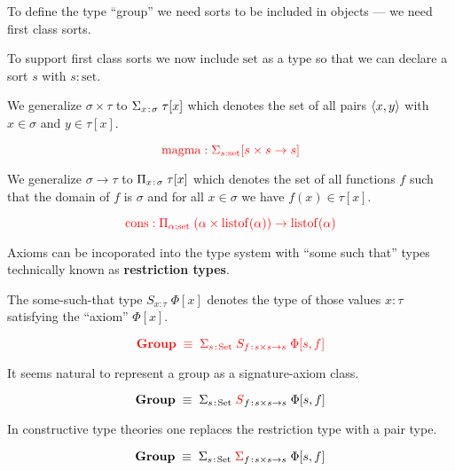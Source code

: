 {\vfill
To define the type ``group'' we need sorts to be included in objects --- we need first class sorts.


\vfill
To support first class sorts we now include {\color{red} $\mathrm{set}$} as a type so that we can declare a sort $s$ with
{\color{red}$s:\mathrm{set}$}.

\vfill
We generalize {\color{red} $\sigma \times \tau$} to {\color{red} $\Sigma_{x\;\!:\!\;\sigma}\;\tau[x]$} which denotes the set of all pairs ${\mbox{$\langle x,y\rangle$}}$ with $x \in \sigma$ and $y \in \tau[x]$.

$${\color{red} \mathrm{magma}: \Sigma_{s:\mathrm{set}} [s\times s \rightarrow s]}$$


We generalize {\color{red} $\sigma \rightarrow \tau$} to {\color{red} $\Pi_{x\;\!:\!\;\sigma}\;\tau[x]$} which denotes the set of all functions $f$ such that the domain of
$f$ is $\sigma$ and for all $x \in \sigma$ we have $f(x) \in \tau[x]$.

\vfill
$${\color{red} \mathrm{\mathrm{cons}}: \Pi_{\alpha:\mathrm{set}}\; (\alpha \times \mathrm{listof}(\alpha)) \rightarrow \mathrm{listof}(\alpha)}$$


Axioms can be incoporated into the type system with ``some such that'' types technically known as {\bf restriction types}.

\vfill
The some-such-that type {\color{red}$S_{x:\tau}\;\Phi[x]$} denotes the type of those values $x:\tau$ satisfying the ``axiom'' $\Phi[x]$.

\vfill
$${\color{red} \mathbf{Group} \; \equiv \; \Sigma_{s\;\!:\!\;\mathrm{Set}}\;S_{f\;\!:\!\; s\times s \rightarrow s}\;\Phi[s,f]}$$
\vfill


It seems natural to represent a group as a signature-axiom class.

$$\mathbf{Group} \; \equiv \; \Sigma_{s\;\!:\!\;\mathrm{Set}}\;{\color{red} S}_{f\;\!:\!\; s\times s \rightarrow s}\;\Phi[s,f]$$

\vfill
In constructive type theories one replaces the restriction type
with a pair type.

$$\mathbf{Group} \; \equiv \; \Sigma_{s\;\!:\!\;\mathrm{Set}}\;{\color{red} \Sigma}_{f\;\!:\!\; s\times s \rightarrow s}\;\Phi[s,f]$$

}
